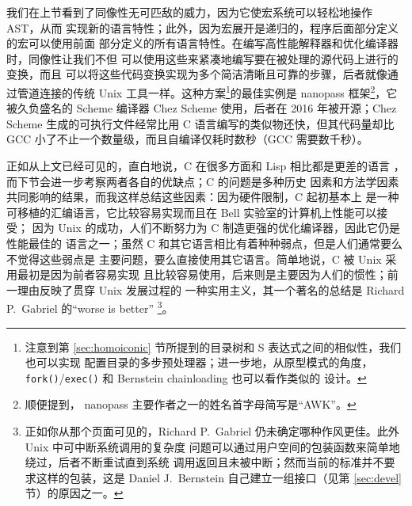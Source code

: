 我们在上节看到了同像性无可匹敌的威力，因为它使宏系统可以轻松地操作 AST，从而
实现新的语言特性；此外，因为宏展开是递归的，程序后面部分定义的宏可以使用前面
部分定义的所有语言特性。在编写高性能解释器和优化编译器时，同像性让我们不但
可以使用这些来紧凑地编写要在被处理的源代码上进行的变换，而且
可以将这些代码变换实现为多个简洁清晰且可靠的步骤，后者就像通过管道连接的传统
Unix 工具一样。这种方案\footnote{\label{fn:slew}注意到第
\ref{sec:homoiconic} 节所提到的目录树和 S 表达式之间的相似性，我们也可以实现
配置目录的多步预处理器；进一步地，从原型模式的角度，%
\texttt{fork()}/\texttt{exec()} 和 Bernstein chainloading 也可以看作类似的
设计。}的最佳实例是 nanopass 框架\footnote{顺便提到，%
nanopass 主要作者之一的姓名首字母简写是“AWK”。}，它被久负盛名的 Scheme 编译器
Chez Scheme 使用，后者在 2016 年被开源；Chez Scheme
生成的可执行文件经常比用 C 语言编写的类似物还快，但其代码量却比
GCC 小了不止一个数量级，而且自编译仅耗时数秒（GCC 需要数千秒）。

正如从上文已经可见的，直白地说，C 在很多方面和 Lisp 相比都是更差的语言%
，而下节会进一步考察两者各自的优缺点；C 的问题是多种历史
因素和方法学因素共同影响的结果，而我这样总结这些因素：因为硬件限制，C 起初基本上
是一种可移植的汇编语言，它比较容易实现而且在 Bell 实验室的计算机上性能可以接受；
因为 Unix 的成功，人们不断努力为 C 制造更强的优化编译器，因此它仍是性能最佳的
语言之一；虽然 C 和其它语言相比有着种种弱点，但是人们通常要么不觉得这些弱点是
主要问题，要么直接使用其它语言。简单地说，C 被 Unix 采用最初是因为前者容易实现
且比较容易使用，后来则是主要因为人们的惯性；前一理由反映了贯穿 Unix 发展过程的
一种实用主义，其一个著名的总结是 Richard P.\ Gabriel 的“worse is better”%
\footnote{正如你从那个页面可见的，Richard
P.\ Gabriel 仍未确定哪种作风更佳。此外 Unix 中可中断系统调用的复杂度
问题可以通过用户空间的包装函数来简单地绕过，后者不断重试直到系统
调用返回且未被中断；然而当前的标准并不要求这样的包装，这是 Daniel
J.\ Bernstein 自己建立一组接口（见第 \ref{sec:devel} 节）的原因之一。}。

